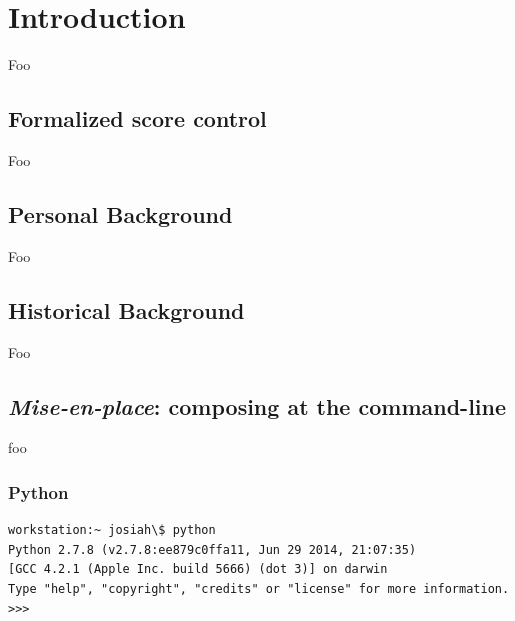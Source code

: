 \chapter{Introduction}

Foo

\section{Formalized score control}

Foo

\section{Personal Background}

Foo

\section{Historical Background}

Foo

\section{\emph{Mise-en-place}: composing at the command-line}

foo

\subsection{Python}

\begin{singlespacing}
\vspace{-0.5\baselineskip}
\begin{lstlisting}
workstation:~ josiah\$ python
Python 2.7.8 (v2.7.8:ee879c0ffa11, Jun 29 2014, 21:07:35)
[GCC 4.2.1 (Apple Inc. build 5666) (dot 3)] on darwin
Type "help", "copyright", "credits" or "license" for more information.
>>>
\end{lstlisting}
\end{singlespacing}

